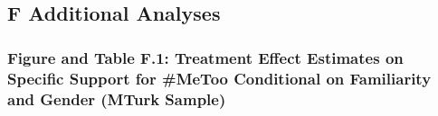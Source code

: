 \documentclass[
]{article}
\begin{document}
\hypertarget{f-additional-analyses}{%
\subsection{F Additional Analyses}\label{f-additional-analyses}}

\setcounter{table}{0}
\renewcommand{\thetable}{F.\arabic{table}}
\setcounter{figure}{0}
\renewcommand{\thefigure}{F.\arabic{figure}}

\hypertarget{figure-and-table-f.1-treatment-effect-estimates-on-specific-support-for-metoo-conditional-on-familiarity-and-gender-mturk-sample}{%
\subsubsection{Figure and Table F.1: Treatment Effect Estimates on
Specific Support for \#MeToo Conditional on Familiarity and Gender
(MTurk
Sample)}\label{figure-and-table-f.1-treatment-effect-estimates-on-specific-support-for-metoo-conditional-on-familiarity-and-gender-mturk-sample}}
\end{document}
